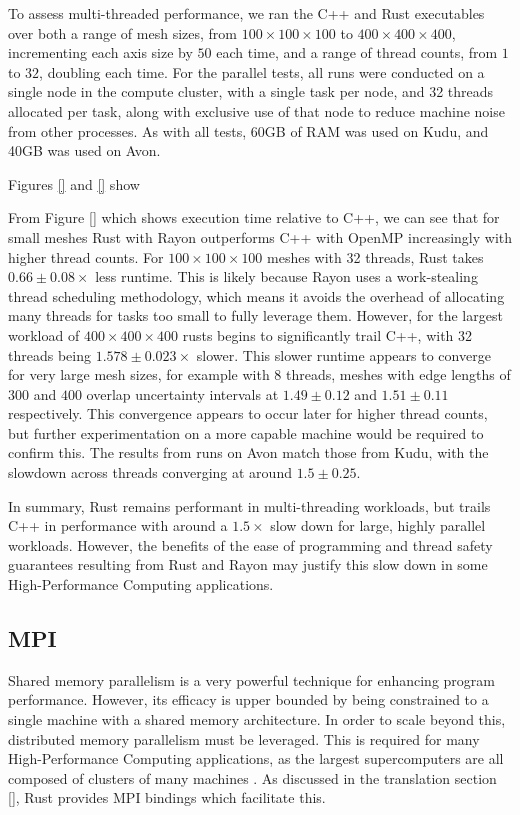 To assess multi-threaded performance, we ran the C++ and Rust executables over both a range of mesh sizes, from $100 \times 100 \times 100$ to $400 \times 400 \times 400$, incrementing each axis size by $50$ each time, and a range of thread counts, from $1$ to $32$, doubling each time. For the parallel tests, all runs were conducted on a single node in the compute cluster, with a single task per node, and 32 threads allocated per task, along with exclusive use of that node to reduce machine noise from other processes. As with all tests, 60GB of RAM was used on Kudu, and 40GB was used on Avon.

Figures \ref{} and \ref{} show 

From Figure \ref{} which shows execution time relative to C++, we can see that for small meshes Rust with Rayon outperforms C++ with OpenMP increasingly with higher thread counts. For $100 \times 100 \times 100$ meshes with 32 threads, Rust takes $0.66 \pm 0.08 \times$ less runtime. This is likely because Rayon uses a work-stealing thread scheduling methodology, which means it avoids the overhead of allocating many threads for tasks too small to fully leverage them. However, for the largest workload of $400 \times 400 \times 400$ rusts begins to significantly trail C++, with 32 threads being $1.578 \pm 0.023 \times$ slower. This slower runtime appears to converge for very large mesh sizes, for example with 8 threads, meshes with edge lengths of $300$ and $400$ overlap uncertainty intervals at $1.49 \pm 0.12$ and $1.51 \pm 0.11$ respectively. This convergence appears to occur later for higher thread counts, but further experimentation on a more capable machine would be required to confirm this. The results from runs on Avon match those from Kudu, with the slowdown across threads converging at around $1.5 \pm 0.25$.

In summary, Rust remains performant in multi-threading workloads, but trails C++ in performance with around a $1.5 \times$ slow down for large, highly parallel workloads. However, the benefits of the ease of programming and thread safety guarantees resulting from Rust and Rayon may justify this slow down in some High-Performance Computing applications.

\subsection{MPI}
\label{ssec:mpi}

Shared memory parallelism is a very powerful technique for enhancing program performance. However, its efficacy is upper bounded by being constrained to a single machine with a shared memory architecture. In order to scale beyond this, distributed memory parallelism must be leveraged. This is required for many High-Performance Computing applications, as the largest supercomputers are all composed of clusters of many machines \cite{HomeTOP500}. As discussed in the translation section \ref{}, Rust provides MPI bindings which facilitate this.

